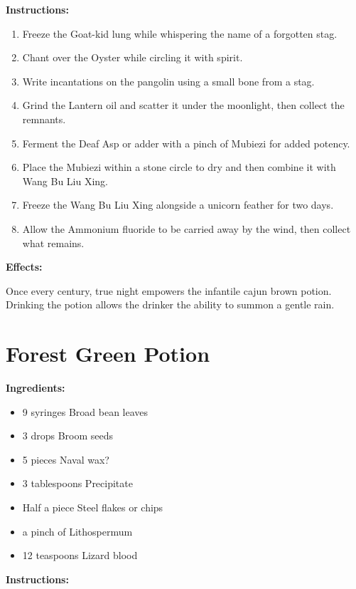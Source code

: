 \documentclass{article}
\begin{document}
\textbf{Instructions:}

\begin{enumerate}
  \item Freeze the Goat-kid lung while whispering the name of a forgotten stag.
  \item Chant over the Oyster while circling it with spirit.
  \item Write incantations on the pangolin using a small bone from a stag.
  \item Grind the Lantern oil and scatter it under the moonlight, then collect the remnants.
  \item Ferment the Deaf Asp or adder with a pinch of Mubiezi for added potency.
  \item Place the Mubiezi within a stone circle to dry and then combine it with Wang Bu Liu Xing.
  \item Freeze the Wang Bu Liu Xing alongside a unicorn feather for two days.
  \item Allow the Ammonium fluoride to be carried away by the wind, then collect what remains.
\end{enumerate}

\textbf{Effects:}

Once every century, true night empowers the infantile cajun brown potion. Drinking the potion allows the drinker the ability to summon a gentle rain.

\newpage
\section*{Forest Green Potion}

\textbf{Ingredients:}

\begin{itemize}
  \item 9 syringes Broad bean leaves
  \item 3 drops Broom seeds
  \item 5 pieces Naval wax?
  \item 3 tablespoons Precipitate
  \item Half a piece Steel flakes or chips
  \item a pinch of Lithospermum
  \item 12 teaspoons Lizard blood
\end{itemize}

\textbf{Instructions:}
\end{document}
